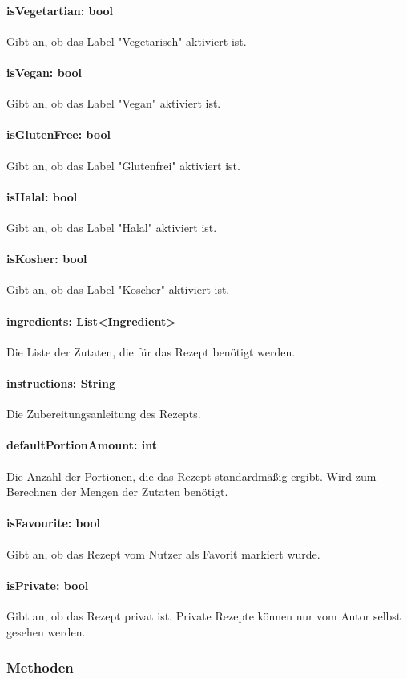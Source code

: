 \documentclass[parskip=full]{scrartcl}
\begin{document}
\paragraph{isVegetartian: bool}
Gibt an, ob das Label "Vegetarisch" aktiviert ist.
\paragraph{isVegan: bool}
Gibt an, ob das Label "Vegan" aktiviert ist.
\paragraph{isGlutenFree: bool}
Gibt an, ob das Label "Glutenfrei" aktiviert ist.
\paragraph{isHalal: bool}
Gibt an, ob das Label "Halal" aktiviert ist.
\paragraph{isKosher: bool}
Gibt an, ob das Label "Koscher" aktiviert ist.
\paragraph{ingredients: List<Ingredient>}
Die Liste der Zutaten, die für das Rezept benötigt werden.
\paragraph{instructions: String}
Die Zubereitungsanleitung des Rezepts.
\paragraph{defaultPortionAmount: int}
Die Anzahl der Portionen, die das Rezept standardmäßig ergibt. Wird zum Berechnen der Mengen der Zutaten benötigt.
\paragraph{isFavourite: bool}
Gibt an, ob das Rezept vom Nutzer als Favorit markiert wurde.
\paragraph{isPrivate: bool}
Gibt an, ob das Rezept privat ist. Private Rezepte können nur vom Autor selbst gesehen werden.

\subsubsection{Methoden}
\end{document}
